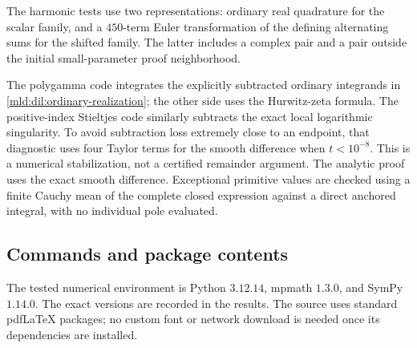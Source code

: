 The harmonic tests use two representations: ordinary real quadrature
for the scalar family, and a $450$-term Euler transformation of the
defining alternating sums for the shifted family. The latter includes
a complex pair and a pair outside the initial small-parameter proof
neighborhood.

The polygamma code integrates the explicitly subtracted ordinary
integrands in \eqref{mld:dil:ordinary-realization}; the other side uses the
Hurwitz-zeta formula. The positive-index Stieltjes code similarly
subtracts the exact local logarithmic singularity. To avoid subtraction
loss extremely close to an endpoint, that diagnostic uses four Taylor
terms for the smooth difference when $t<10^{-8}$. This is a numerical
stabilization, not a certified remainder argument. The analytic proof
uses the exact smooth difference. Exceptional primitive values are
checked using a finite Cauchy mean of the complete closed expression
against a direct anchored integral, with no individual pole evaluated.

\subsection{Commands and package contents}

The tested numerical environment is Python $3.12.14$, mpmath $1.3.0$,
and SymPy $1.14.0$. The exact versions are recorded in the results.
The source uses standard pdfLaTeX packages; no custom font or network
download is needed once its dependencies are installed.

